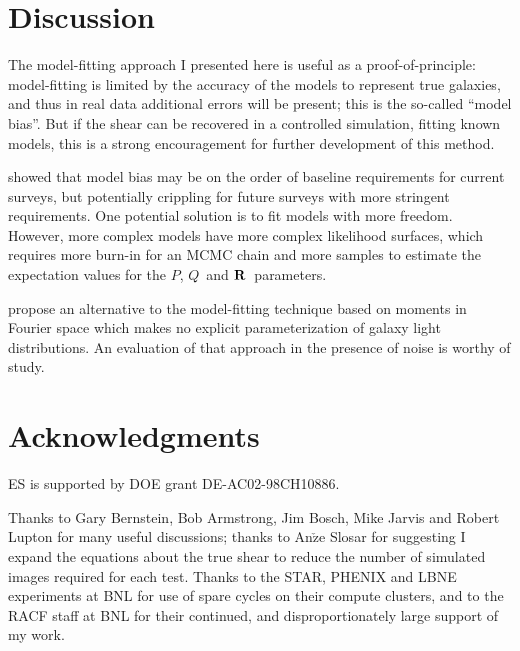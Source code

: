 \documentclass[12pt,preprint]{aastex}
\newcommand{\vecQ}{\mbox{\boldmath $Q$}}
\newcommand{\matR}{\mbox{$\bf R$}}
\begin{document}
\section{Discussion} \label{sec:summary}

The model-fitting approach I presented here is useful as a proof-of-principle:
model-fitting is limited by the accuracy of the models to represent true
galaxies, and thus in real data additional errors will be present; this is the
so-called ``model bias''.  But if the shear can be recovered in a controlled
simulation, fitting known models, this is a strong encouragement for further
development of this method.

\cite{Kacprzak13} showed that model bias may be on the order of baseline
requirements for current surveys, but potentially crippling for future surveys
with more stringent requirements. One potential solution is to fit models with
more freedom.  However, more complex models have more complex likelihood
surfaces, which requires more burn-in for an MCMC chain and more samples to
estimate the expectation values for the $P$, \vecQ\ and \matR\ parameters.

\cite{ba14} propose an alternative to the model-fitting technique based on
moments in Fourier space which makes no explicit parameterization of galaxy
light distributions.  An evaluation of that approach in the presence of noise
is worthy of study.

\section*{Acknowledgments}

ES is supported by DOE grant DE-AC02-98CH10886.

Thanks to Gary Bernstein, Bob Armstrong, Jim Bosch, Mike Jarvis and Robert
Lupton for many useful discussions; thanks to An$\check{\textrm{z}}$e Slosar for
suggesting I expand the equations about the true shear to reduce the number of
simulated images required for each test.  Thanks to the STAR, PHENIX and LBNE
experiments at BNL for use of spare cycles on their compute clusters, and to
the RACF staff at BNL for their continued, and disproportionately large support
of my work.




\end{document}
